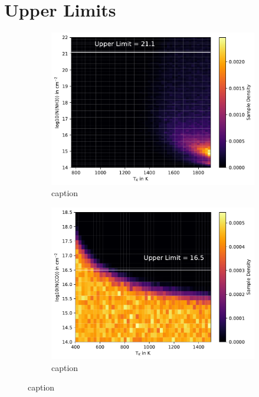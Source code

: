 \documentclass[oneside, single, authoryear, semicolon, 12pt]{lion-msc}
\newcommand{\4}{$_4$}
\newcommand{\3}{$_3$}
\newcommand{\2}{$_2$}
\begin{document}
\chapter{Upper Limits}
\begin{figure}[!ht]
    \centering
    \begin{subfigure}[b]{0.49\textwidth}
        \centering
        \includegraphics[width=\textwidth]{radexpy_niels/Radexpy_for_Niels/upper_NH3_GWLup.pdf}
        \caption{caption}
    \end{subfigure}
    \hfill
    \begin{subfigure}[b]{0.49\textwidth}
        \centering
        \includegraphics[width=\textwidth]{upper_CO_GWLup.pdf}
        \caption{caption}
    \end{subfigure}
    \caption{caption}
\end{figure}
\end{document}
